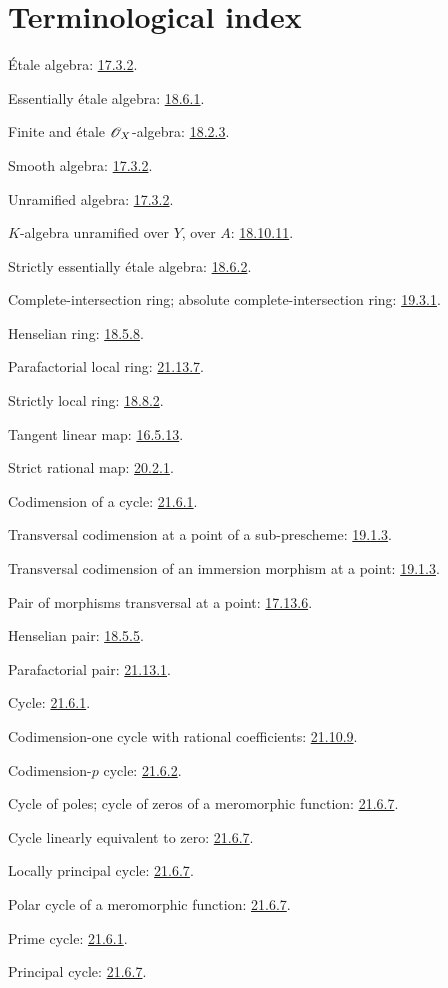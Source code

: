\clearpage
{}
{}
\section*{Terminological index}

\begingroup
\small
\setlength{\parindent}{0pt}
\setlength{\parskip}{2pt}
\newcommand{\EGAIVterm}[2]{#1: #2.\par}
\newcommand{\EGAIVidxref}[1]{\hyperref[IV.#1]{#1}}

\EGAIVterm{\'Etale algebra}{{\hyperref[section:IV.17]{17.3.2}}}
\EGAIVterm{Essentially \'etale algebra}{{\hyperref[IV.18.6.1]{18.6.1}}}
\EGAIVterm{Finite and \'etale $\mathscr{O}_X$-algebra}{{\hyperref[IV.18.2.3]{18.2.3}}}
\EGAIVterm{Smooth algebra}{{\hyperref[section:IV.17]{17.3.2}}}
\EGAIVterm{Unramified algebra}{{\hyperref[section:IV.17]{17.3.2}}}
\EGAIVterm{$K$-algebra unramified over $Y$, over $A$}{{\hyperref[IV.18.10.11]{18.10.11}}}
\EGAIVterm{Strictly essentially \'etale algebra}{{\hyperref[IV.18.6.2]{18.6.2}}}
\EGAIVterm{Complete-intersection ring; absolute complete-intersection ring}{{\hyperref[IV.19.3.1]{19.3.1}}}
\EGAIVterm{Henselian ring}{{\hyperref[IV.18.5.8]{18.5.8}}}
\EGAIVterm{Parafactorial local ring}{{\hyperref[IV.21.13.7]{21.13.7}}}
\EGAIVterm{Strictly local ring}{{\hyperref[IV.18.8.2]{18.8.2}}}
\EGAIVterm{Tangent linear map}{{\hyperref[section:IV.16]{16.5.13}}}
\EGAIVterm{Strict rational map}{{\hyperref[IV.20]{20.2.1}}}
\EGAIVterm{Codimension of a cycle}{{\hyperref[IV.21.6.1]{21.6.1}}}
\EGAIVterm{Transversal codimension at a point of a sub-prescheme}{{\hyperref[IV.19.1.3]{19.1.3}}}
\EGAIVterm{Transversal codimension of an immersion morphism at a point}{{\hyperref[IV.19.1.3]{19.1.3}}}
\EGAIVterm{Pair of morphisms transversal at a point}{{\hyperref[IV.17.13]{17.13.6}}}
\EGAIVterm{Henselian pair}{{\hyperref[IV.18.5.5]{18.5.5}}}
\EGAIVterm{Parafactorial pair}{{\hyperref[IV.21.13.1]{21.13.1}}}
\EGAIVterm{Cycle}{{\hyperref[IV.21.6.1]{21.6.1}}}
\EGAIVterm{Codimension-one cycle with rational coefficients}{{\hyperref[IV.21.10.9]{21.10.9}}}
\EGAIVterm{Codimension-$p$ cycle}{{\hyperref[IV.21.6.2]{21.6.2}}}
\EGAIVterm{Cycle of poles; cycle of zeros of a meromorphic function}{{\hyperref[IV.21.6.7]{21.6.7}}}
\EGAIVterm{Cycle linearly equivalent to zero}{{\hyperref[IV.21.6.7]{21.6.7}}}
\EGAIVterm{Locally principal cycle}{{\hyperref[IV.21.6.7]{21.6.7}}}
\EGAIVterm{Polar cycle of a meromorphic function}{{\hyperref[IV.21.6.7]{21.6.7}}}
\EGAIVterm{Prime cycle}{{\hyperref[IV.21.6.1]{21.6.1}}}
\EGAIVterm{Principal cycle}{{\hyperref[IV.21.6.7]{21.6.7}}}
